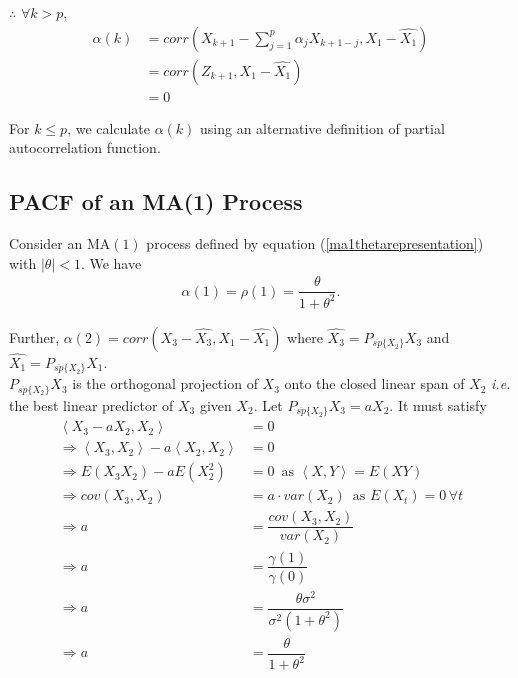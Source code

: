 \documentclass[11pt, a4paper]{article}
\numberwithin{equation}{section}
\theoremstyle{definition}
\begin{document}
$\therefore$ $\forall k > p$,
\begin{align*}
\alpha(k) &= corr\left(X_{k+1} - \sum \limits_{j = 1}^{p} \alpha_j X_{k+1-j}, X_1 - \widehat{X_1}\right) \\[0.25em]
&= corr\left(Z_{k+1}, X_1 - \widehat{X_1}\right) \\[0.25em]
&= 0
\end{align*}

For $k \leq p$, we calculate $\alpha(k)$ using an alternative definition of partial autocorrelation function.

\subsection{PACF of an MA(1) Process}

Consider an MA$(1)$ process defined by equation (\ref{ma1thetarepresentation}) with $|\theta| < 1$. We have
\begin{align*}
\alpha(1) = \rho(1) = \dfrac{\theta}{1 + \theta^2}.
\end{align*}

Further, $\alpha(2) = corr(X_3 - \widehat{X_3}, X_1 - \widehat{X_1})$ where $\widehat{X_3} = P_{\overline{sp}\{X_2\}} X_3$ and $\widehat{X_1} = P_{\overline{sp}\{X_2\}} X_1$. \\[0.25em]

$P_{\overline{sp}\{X_2\}} X_3$ is the orthogonal projection of $X_3$ onto the closed linear span of $X_2$ \textit{i.e.} the best linear predictor of $X_3$ given $X_2$. Let $P_{\overline{sp}\{X_2\}} X_3 = aX_2$. It must satisfy
\begin{align*}
\left\langle X_3 - aX_2, X_2\right\rangle &= 0 \\[0.25em]
\Rightarrow \left\langle X_3, X_2 \right\rangle - a \left\langle X_2, X_2 \right\rangle &= 0 \\[0.25em]
\Rightarrow E(X_3X_2) - aE(X_2^2) &= 0 \, \text{ as } \left\langle X, Y \right\rangle = E(XY) \\[0.25em]
\Rightarrow cov(X_3, X_2) &= a \cdot var(X_2) \, \text{ as } E(X_t) = 0 \, \forall t \\[0.25em]
\Rightarrow a &= \dfrac{cov(X_3, X_2)}{var(X_2)} \\[0.25em]
\Rightarrow a &= \dfrac{\gamma(1)}{\gamma(0)} \\[0.25em]
\Rightarrow a &= \dfrac{\theta \sigma^2}{\sigma^2 (1 + \theta^2)} \\[0.25em]
\Rightarrow a &= \dfrac{\theta}{1 + \theta^2}
\end{align*}
\end{document}
